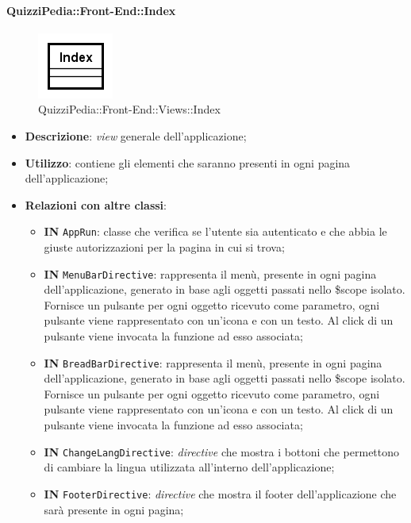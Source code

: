 	
	\paragraph{QuizziPedia::Front-End::Index}
	\begin{figure} [ht]
		\centering
		\includegraphics[scale=0.7]{UML/Classi/Front-End/QuizziPedia_Front-end_Views_Index.png}
		\caption{QuizziPedia::Front-End::Views::Index}
	\end{figure} \FloatBarrier
	\begin{itemize}
		\item \textbf{Descrizione}: \textit{view} generale dell'applicazione;
		\item \textbf{Utilizzo}: contiene gli elementi che saranno presenti in ogni pagina dell'applicazione;
		\item \textbf{Relazioni con altre classi}:
		\begin{itemize}
			\item \textbf{IN} \texttt{AppRun}: classe che verifica se l'utente sia autenticato e che abbia le giuste autorizzazioni per la pagina in cui si trova;
			\item \textbf{IN} \texttt{MenuBarDirective}: rappresenta il menù, presente in ogni pagina dell'applicazione, generato in base agli oggetti passati nello \$scope isolato. Fornisce un pulsante per ogni oggetto ricevuto come parametro, ogni pulsante viene rappresentato con un’icona e con un testo. Al click di un pulsante viene invocata la funzione ad esso associata;
			\item \textbf{IN} \texttt{BreadBarDirective}: rappresenta il menù, presente in ogni pagina dell'applicazione,
			generato in base agli oggetti passati nello \$scope isolato. Fornisce un
			pulsante per ogni oggetto ricevuto come parametro, ogni pulsante viene
			rappresentato con un'icona e con un testo. Al click di un pulsante viene
			invocata la funzione ad esso associata;
			\item \textbf{IN} \texttt{ChangeLangDirective}: \textit{directive} che mostra i bottoni che permettono di cambiare la lingua utilizzata all'interno dell'applicazione;
			\item \textbf{IN} \texttt{FooterDirective}: \textit{directive} che mostra il footer dell'applicazione che sarà presente in ogni pagina;

\end{itemize}
\end{itemize}
